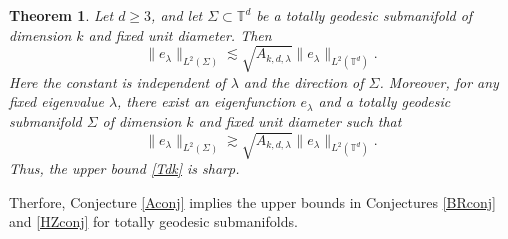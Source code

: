 \documentclass[11pt,reqno]{amsart}
\newtheorem{theorem}{Theorem}[section]
\numberwithin{equation}{section}
\newcommand{\1}{\textbf{1}}
\newcommand{\ls}{\lesssim}
\newcommand{\gs}{\gtrsim}
\begin{document}
	\begin{theorem}\label{prop3a}\label{prop:logfree-reduction}
		Let $d\ge3$, and let $\Sigma\subset \mathbb{T}^d$ be a totally geodesic submanifold of dimension $k$ and fixed unit diameter. Then
		\begin{equation}\label{Tdk}
			\|e_\lambda\|_{L^2(\Sigma)}\ls
			\sqrt{A_{k,d,\lambda}}
			\|e_\lambda\|_{L^2({\mathbb{T}^d})}.
		\end{equation}
		Here the constant is independent of $\lambda$ and the direction of $\Sigma$.
		Moreover, for any fixed eigenvalue $\lambda$, there exist an eigenfunction $e_\lambda$ and a totally geodesic submanifold $\Sigma$ of dimension $k$ and fixed unit diameter  such that
		\begin{equation}\label{Tdksharp}
			\|e_\lambda\|_{L^2(\Sigma)}\gs
			\sqrt{A_{k,d,\lambda}}\|e_\lambda\|_{L^2({\mathbb{T}^d})}.
		\end{equation}
		Thus, the upper bound \eqref{Tdk} is sharp.
	\end{theorem}
	Therfore, Conjecture \ref{Aconj} implies the upper bounds in Conjectures \ref{BRconj} and \ref{HZconj} for totally geodesic submanifolds.
\end{document}
